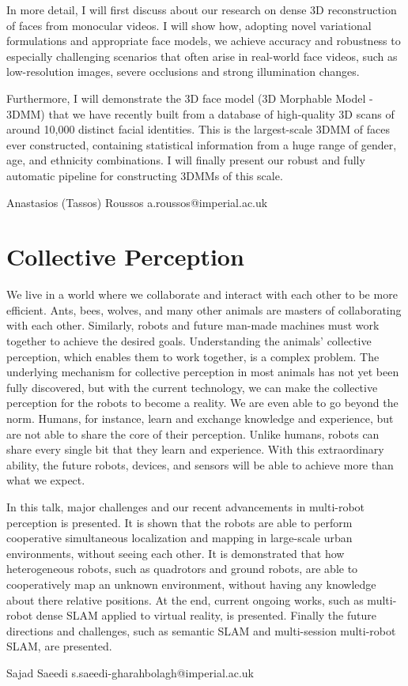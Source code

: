 \documentclass{article}
\begin{document}
In more detail, I will first discuss about our research on dense 3D
reconstruction of faces from monocular videos. I will show how, adopting novel
variational formulations and appropriate face models, we achieve accuracy and
robustness to especially challenging scenarios that often arise in real-world
face videos, such as low-resolution images, severe occlusions and strong
illumination changes.

Furthermore, I will demonstrate the 3D face model (3D Morphable Model - 3DMM)
that we have recently built from a database of high-quality 3D scans of around
10,000 distinct facial identities. This is the largest-scale 3DMM of faces ever
constructed, containing statistical information from a huge range of gender,
age, and ethnicity combinations. I will finally present our robust and fully
automatic pipeline for constructing 3DMMs of this scale.


Anastasios (Tassos) Roussos
a.roussos@imperial.ac.uk
\section*{Collective Perception}

We live in a world where we collaborate and interact with each other to be more
efficient. Ants, bees, wolves, and many other animals are masters of
collaborating with each other. Similarly, robots and future man-made machines
must work together to achieve the desired goals. Understanding the animals'
collective perception, which enables them to work together, is a complex
problem. The underlying mechanism for collective perception in most animals has
not yet been fully discovered, but with the current technology, we can make the
collective perception for the robots to become a reality. We are even able to go
beyond the norm. Humans, for instance, learn and exchange knowledge and
experience, but are not able to share the core of their perception. Unlike
humans, robots can share every single bit that they learn and experience. With
this extraordinary ability, the future robots, devices, and sensors will be able
to achieve more than what we expect.

In this talk, major challenges and our recent advancements in multi-robot
perception is presented. It is shown that the robots are able to perform
cooperative simultaneous localization and mapping in large-scale urban
environments, without seeing each other. It is demonstrated that how
heterogeneous robots, such as quadrotors and ground robots, are able to
cooperatively map an unknown environment, without having any knowledge about
there relative positions. At the end, current ongoing works, such as multi-robot
dense SLAM applied to virtual reality, is presented. Finally the future
directions and challenges, such as semantic SLAM and multi-session multi-robot
SLAM, are presented.

Sajad Saeedi
s.saeedi-gharahbolagh@imperial.ac.uk
\end{document}
